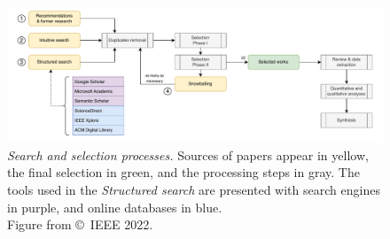 \begin{figure}
  \centering
  \includegraphics[width=\textwidth]{figures/methodo-survey.drawio.pdf}
  \caption[
    Search and selection processes.
  ]{
    \emph{Search and selection processes.}
    Sources of papers appear in yellow, the final selection in green, and the processing steps in gray.
    The tools used in the \emph{Structured search} are presented with search engines in purple, and online databases in blue.\\
    Figure from \textcite{lavaur_EvolutionFederatedLearningbased_2022} \copyright~IEEE 2022.
    \label{fig:sota.methodo.original}
  }
\end{figure}


